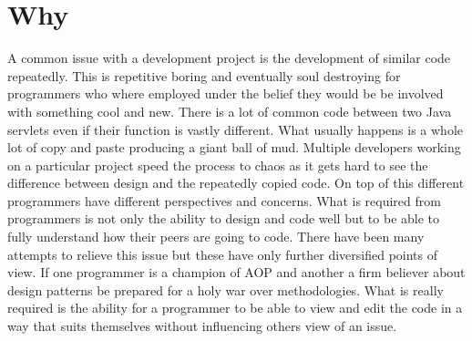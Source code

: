 \documentclass[12pt]{CRPITStyle}
\begin{document}
\section{Why}
A common issue with a development project is the development of similar code repeatedly.  This is repetitive boring and eventually soul destroying for programmers who where employed under the belief they would be be involved with something cool and new. There is a lot of common code between two Java servlets even if their function is vastly different. What usually happens is a whole lot of copy and paste producing a giant ball of mud.  Multiple developers working on a particular project speed the process to chaos as it gets hard to see the difference between design and the repeatedly copied code.  On top of this different programmers have different perspectives and concerns.  What is required from programmers is not only the ability to design and code well but to be able to fully understand how their peers are going to code.  There have been many attempts to relieve this issue but these have only further diversified points of view.  If one programmer is a champion of AOP and another a firm believer about design patterns be prepared for a holy war over methodologies.  What is really required is the ability for a programmer to be able to view and edit the code in a way that suits themselves without influencing others view of an issue. 

{}

\end{document}
